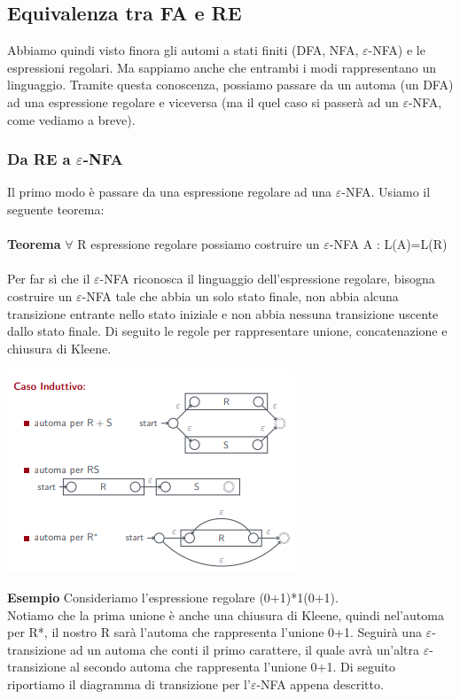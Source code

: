 \documentclass[]{article}
\begin{document}
		\subsection{Equivalenza tra FA e RE}
			Abbiamo quindi visto finora gli automi a stati finiti (DFA, NFA, $\varepsilon$-NFA) e le espressioni regolari. Ma sappiamo anche che entrambi i modi rappresentano un linguaggio. Tramite questa conoscenza, possiamo passare da un automa (un DFA) ad una espressione regolare e viceversa (ma il quel caso si passerà ad un $\varepsilon$-NFA, come vediamo a breve).
			\subsubsection{Da RE a $\varepsilon$-NFA}
				Il primo modo è passare da una espressione regolare ad una $\varepsilon$-NFA. Usiamo il seguente teorema:\\\\
				\textbf{Teorema} $\forall$ R espressione regolare possiamo costruire un $\varepsilon$-NFA A : L(A)=L(R)\\\\
				Per far sì che il $\varepsilon$-NFA riconosca il linguaggio dell'espressione regolare, bisogna costruire un $\varepsilon$-NFA tale che abbia un solo stato finale, non abbia alcuna transizione entrante nello stato iniziale e non abbia nessuna transizione uscente dallo stato finale. Di seguito le regole per rappresentare unione, concatenazione e chiusura di Kleene.
				\begin{center}
					\includegraphics{ConversioneRENFA.png}
				\end{center}
				\textbf{Esempio} Consideriamo l'espressione regolare (0+1)*1(0+1).\\
				Notiamo che la prima unione è anche una chiusura di Kleene, quindi nel'automa per R*, il nostro R sarà l'automa che rappresenta l'unione 0+1. Seguirà una $\varepsilon$-transizione ad un automa che conti il primo carattere, il quale avrà un'altra $\varepsilon$-transizione al secondo automa che rappresenta l'unione 0+1. Di seguito riportiamo il diagramma di transizione per l'$\varepsilon$-NFA appena descritto.
\end{document}
